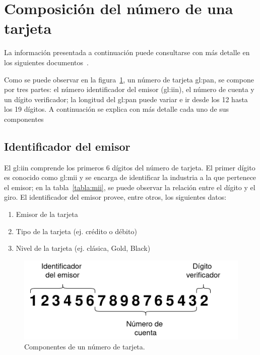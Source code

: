 %
%

\section{Composición del número de una tarjeta}
\label{sec:composicion_tarjeta}

La información presentada a continuación puede consultarse con más detalle en
los siguientes documentos~\cite{iso_7812, iso_9362, pci_definitive_guide}.

Como se puede observar en la figura~\ref{figura:pan}, un número de tarjeta
\gls{gl:pan}, se compone por tres partes: el número identificador del emisor
(\gls{gl:iin}), el número de cuenta y un dígito verificador; la longitud del
\gls{gl:pan} puede variar e ir desde los 12 hasta los 19 dígitos. A
continuación se explica con más detalle cada uno de sus componentes

\subsection{Identificador del emisor}
El \gls{gl:iin} comprende los primeros 6 dígitos del número de
tarjeta. El primer dígito es conocido como \gls{gl:mii} y se encarga de
identificar la industria a la que pertenece el emisor; en la
tabla~\ref{tabla:mii}, se puede observar la relación entre el dígito y el giro.
El identificador del emisor provee, entre otros, los siguientes datos:

\begin{enumerate}
    \item Emisor de la tarjeta
    \item Tipo de la tarjeta (ej. crédito o débito)
    \item Nivel de la tarjeta (ej. clásica, Gold, Black)
\end{enumerate}

\begin{figure}
  \begin{center}
    \includegraphics[width=0.6\linewidth]{diagramas/tarjeta}
    \caption{Componentes de un número de tarjeta.}\label{figura:pan}
   \end{center}
\end{figure}

